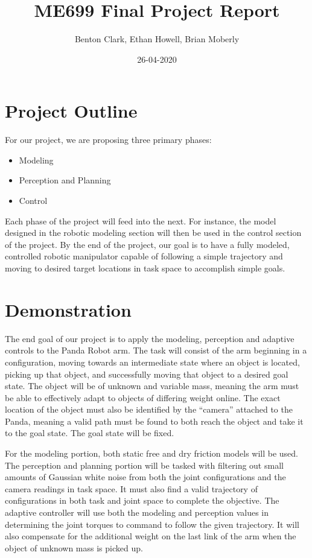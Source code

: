 \documentclass{article}
\title{ME699 Final Project Report}
\date{26-04-2020}
\author{Benton Clark, Ethan Howell, Brian Moberly}
\begin{document}
\maketitle

\section{Project Outline}
For our project, we are proposing three primary phases:

\begin{itemize}
  \item Modeling
  \item Perception and Planning
  \item Control
\end{itemize}

\noindent Each phase of the project will feed into the next.
For instance, the model designed in the robotic modeling section will then be
used in the control section of the project.
By the end of the project, our goal is to have a fully modeled, controlled
robotic manipulator capable of following a simple trajectory and moving to
desired target locations in task space to accomplish simple goals.

\section{Demonstration}
The end goal of our project is to apply the modeling, perception and adaptive
controls to the Panda Robot arm.
The task will consist of the arm beginning in a configuration, moving towards an
intermediate state where an object is located, picking up that object, and
successfully moving that object to a desired goal state.
The object will be of unknown and variable mass, meaning the arm must be able to
effectively adapt to objects of differing weight online.
The exact location of the object must also be identified by the ``camera''
attached to the Panda, meaning a valid path must be found to both reach the
object and take it to the goal state.
The goal state will be fixed.

For the modeling portion, both static free and dry friction models will be used.
The perception and planning portion will be tasked with filtering out small
amounts of Gaussian white noise from both the joint configurations and the
camera readings in task space.
It must also find a valid trajectory of configurations in both task and joint
space to complete the objective.
The adaptive controller will use both the modeling and perception values in
determining the joint torques to command to follow the given trajectory.
It will also compensate for the additional weight on the last link of the arm
when the object of unknown mass is picked up.
\end{document}
